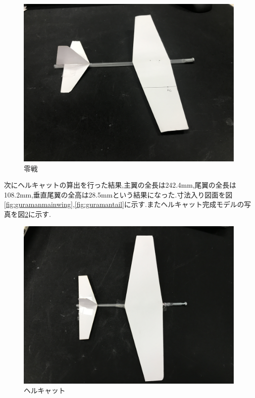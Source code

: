\begin{figure}[htbp]
  \begin{center}
    \includegraphics[width=140mm]{sen.JPG}
    \end{center}
  \caption{零戦}
 \label{fig:sen}
\end{figure}


次にヘルキャットの算出を行った結果,主翼の全長は242.4mm,尾翼の全長は108.2mm,垂直尾翼の全高は28.5mmという結果になった.寸法入り図面を図\ref{fig:guramanmainwing},\ref{fig:guramantail}に示す.またヘルキャット完成モデルの写真を図\ref{fig:man}に示す.

\begin{figure}[htbp]
  \begin{center}
    \includegraphics[width=140mm]{man.JPG}
    \end{center}
  \caption{ヘルキャット}
 \label{fig:man}
\end{figure}

